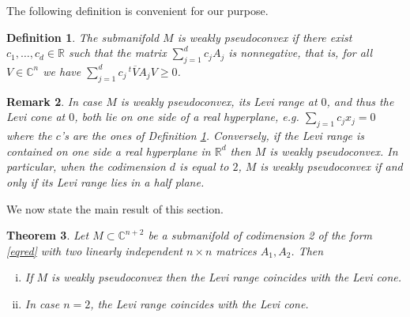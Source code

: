 \documentclass[10pt,a4paper]{amsart}
\newcommand{\C}{\mathbb C}
\newcommand{\R}{\mathbb R}
\newcommand{\transp}{\,^t}
\newtheorem{theo}{Theorem}[section]
\newtheorem{remark}[theo]{Remark}
\newtheorem{defi}[theo]{Definition}
\numberwithin{equation}{section}
\begin{document}
The following definition is convenient for our purpose. 
\begin{defi}\label{defweak}
The submanifold $M$ is {\it weakly pseudoconvex} if there exist $c_1,\ldots,c_d\in \R$ such that the matrix $\sum_{j=1}^dc_jA_j$ is nonnegative, that is,  for all $V \in \C^n$ we have $\sum_{j=1}^dc_j\transp\overline{V}A_jV \geq 0$.   
\end{defi}
\begin{remark}\label{remlight}
In case $M$ is weakly pseudoconvex, its  Levi range at $0$, and thus the Levi cone at $0$, both lie on one side of a real hyperplane, e.g. $\sum_{j=1}c_jx_j=0$ where the $c$'s are the ones of Definition \ref{defweak}.  Conversely, if the Levi range is contained on one side a real hyperplane in $\R^d$ then  $M$ is  weakly pseudoconvex. In particular, when the codimension $d$ is equal to $2$, $M$ is  weakly pseudoconvex if and only if its Levi range lies in a half plane.   
\end{remark}

We now state the main result of this section. 


\begin{theo}\label{theorangecone}
Let $M \subset \C^{n+2}$ be a submanifold of codimension 2 of the form \eqref{eqred} with  two linearly independent $n\times n$ matrices $A_1,A_2$. Then
\begin{enumerate}[i.]
\item If $M$ is weakly pseudoconvex then the Levi range coincides with the Levi cone.
\item In case $n=2$, the Levi range  coincides with the Levi cone.
\end{enumerate}
\end{theo}
\end{document}
